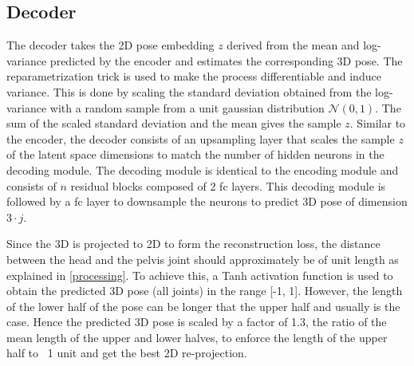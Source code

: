 \subsection{Decoder}

The decoder takes the 2D pose embedding $z$ derived from the mean and log-variance predicted by the encoder and estimates the corresponding 3D pose. The reparametrization trick is used to make the process differentiable and induce variance. This is done by scaling the standard deviation obtained from the log-variance with a random sample from a unit gaussian distribution $\mathcal{N}(0,1)$. The sum of the scaled standard deviation and the mean gives the sample $z$. Similar to the encoder, the decoder consists of an upsampling layer that scales the sample $z$ of the latent space dimensions to match the number of hidden neurons in the decoding module. The decoding module is identical to the encoding module and consists of $n$ residual blocks composed of 2 \ac{fc} layers. This decoding module is followed by a \ac{fc} layer to downsample the neurons to predict 3D pose of dimension $3 \cdot j$. 

Since the 3D is projected to 2D to form the reconstruction loss, the distance between the head and the pelvis joint should approximately be of unit length as explained in \ref{processing}. To achieve this, a Tanh activation function is used to obtain the predicted 3D pose (all joints) in the range [-1, 1]. However, the length of the lower half of the pose can be longer that the upper half and usually is the case. Hence the predicted 3D pose is scaled by a factor of 1.3, the ratio of the mean length of the upper and lower halves, to enforce the length of the upper half to ~1 unit and get the best 2D re-projection.

